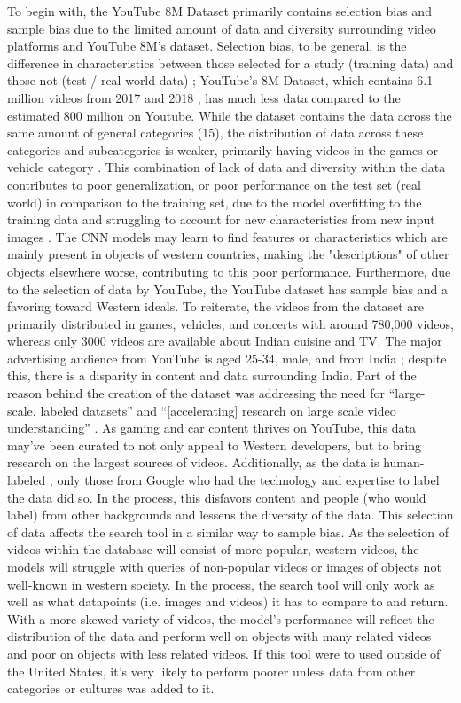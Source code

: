 \documentclass[10pt,twocolumn]{article}
\begin{document}
To begin with, the YouTube 8M Dataset primarily contains selection bias and sample bias due to the limited amount of data and diversity surrounding video platforms and YouTube 8M’s dataset. Selection bias, to be general, is the difference in characteristics between those selected for a study (training data) and those not (test / real world data) \cite{Yu2020}; YouTube’s 8M Dataset, which contains 6.1 million videos from 2017 and 2018 \cite{googleYT8M}, has much less data compared to the estimated 800 million on Youtube. While the dataset contains the data across the same amount of general categories (15), the distribution of data across these categories and subcategories is weaker, primarily having videos in the games or vehicle category \cite{googleYT8M}. This combination of lack of data and diversity within the data contributes to poor generalization, or poor performance on the test set (real world) in comparison to the training set, due to the model overfitting to the training data and struggling to account for new characteristics from new input images \cite{Yu2020}. The CNN models may learn to find features or characteristics which are mainly present in objects of western countries, making the "descriptions" of other objects elsewhere worse, contributing to this poor performance. Furthermore, due to the selection of data by YouTube, the YouTube dataset has sample bias and a favoring toward Western ideals. To reiterate, the videos from the dataset are primarily distributed in games, vehicles, and concerts with around 780,000 videos, whereas only 3000 videos are available about Indian cuisine and TV. The major advertising audience from YouTube is aged 25-34, male, and from India \cite{HootSuite2022}; despite this, there is a disparity in content and data surrounding India. Part of the reason behind the creation of the dataset was addressing the need for “large-scale, labeled datasets” and “[accelerating] research on large scale video understanding” \cite{Warrick2020}. As gaming and car content thrives on YouTube, this data may’ve been curated to not only appeal to Western developers, but to bring research on the largest sources of videos. Additionally, as the data is human-labeled \cite{googleYT8M}, only those from Google who had the technology and expertise to label the data did so. In the process, this disfavors content and people (who would label) from other backgrounds and lessens the diversity of the data. This selection of data affects the search tool in a similar way to sample bias. As the selection of videos within the database will consist of more popular, western videos, the models will struggle with queries of non-popular videos or images of objects not well-known in western society. In the process, the search tool will only work as well as what datapoints (i.e. images and videos) it has to compare to and return. With a more skewed variety of videos, the model's performance will reflect the distribution of the data and perform well on objects with many related videos and poor on objects with less related videos. If this tool were to used outside of the United States, it's very likely to perform poorer unless data from other categories or cultures was added to it.  
\end{document}
